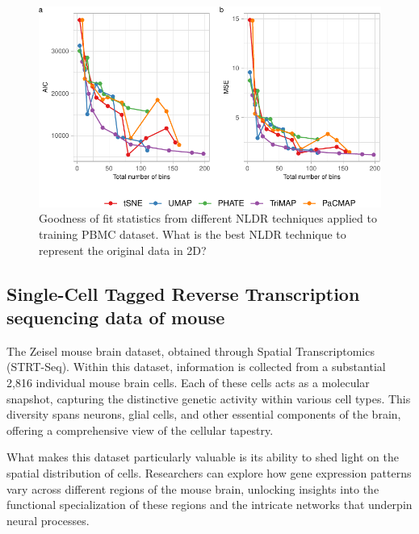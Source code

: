 \documentclass[
  12pt]{article}
\begin{document}
\begin{figure}

{\centering \includegraphics[width=1\textwidth,height=\textheight]{paper_files/figure-pdf/fig-diagnosticpltPBMC-1.pdf}

}

\caption{\label{fig-diagnosticpltPBMC}Goodness of fit statistics from
different NLDR techniques applied to training PBMC dataset. What is the
best NLDR technique to represent the original data in 2D?}

\end{figure}

\hypertarget{single-cell-tagged-reverse-transcription-sequencing-data-of-mouse}{%
\subsection{Single-Cell Tagged Reverse Transcription sequencing data of
mouse}\label{single-cell-tagged-reverse-transcription-sequencing-data-of-mouse}}

The Zeisel mouse brain dataset, obtained through Spatial Transcriptomics
(STRT-Seq). Within this dataset, information is collected from a
substantial 2,816 individual mouse brain cells. Each of these cells acts
as a molecular snapshot, capturing the distinctive genetic activity
within various cell types. This diversity spans neurons, glial cells,
and other essential components of the brain, offering a comprehensive
view of the cellular tapestry.

What makes this dataset particularly valuable is its ability to shed
light on the spatial distribution of cells. Researchers can explore how
gene expression patterns vary across different regions of the mouse
brain, unlocking insights into the functional specialization of these
regions and the intricate networks that underpin neural processes.
\end{document}
